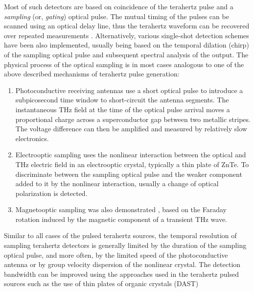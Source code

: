 Most of such detectors are based on coincidence of the terahertz pulse and a \textit{sampling} (or, \textit{gating}) optical pulse. The mutual timing of the pulses can be scanned using an optical delay line, thus the terahertz waveform can be recovered over repeated measurements \cite{wu1996ultrafast}.  %
Alternatively, various single-shot detection schemes have been also implemented, usually being based on the temporal dilation (chirp) of the sampling optical pulse and subsequent spectral analysis of the output.
The physical process of the optical sampling is in most cases analogous to one of the above described mechanisms of terahertz pulse generation:
\begin{enumerate}
 \item{Photoconductive receiving antennas use a short optical pulse to introduce a subpicosecond time window to short-circuit the antenna segments. The instantaneous THz field at the time of the optical pulse arrival moves a proportional charge across a superconductor gap between two metallic stripes. The voltage difference can then be amplified and measured by relatively slow electronics.} 
 \item{Electrooptic sampling uses the nonlinear interaction between the optical and THz electric field in an electrooptic crystal, typically a thin plate of ZnTe. To discriminate between the sampling optical pulse and the weaker component added to it by the nonlinear interaction, usually a change of optical polarization is detected.}  %
 \item{Magnetooptic sampling was also demonstrated \cite{riordan1997free}, based on the Faraday rotation induced by the magnetic component of a transient THz wave.}
 \end{enumerate}
Similar to all cases of the pulsed terahertz sources, the temporal resolution of sampling terahertz detectors is generally limited by the duration of the sampling optical pulse, and more often, by the limited speed of the photoconductive antenna or by group velocity dispersion of the nonlinear crystal. The detection bandwidth can be improved using the approaches used in the terahertz pulsed sources  such as the use of thin plates of organic crystals (DAST) %
